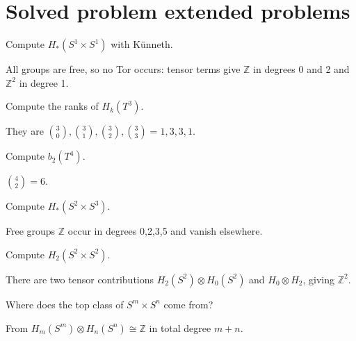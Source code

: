 \section{Solved problem extended problems}

\begin{problem}[Torus]\label{prob:viii27-01}
Compute \(H_*(S^1\times S^1)\) with Künneth.
\end{problem}
\begin{solution}
All groups are free, so no Tor occurs: tensor terms give \(\mathbb Z\) in degrees 0 and 2 and \(\mathbb Z^2\) in degree 1.
\end{solution}

\begin{problem}\label{prob:viii27-02}
Compute the ranks of \(H_k(T^3)\).
\end{problem}
\begin{solution}
They are \(\binom30,\binom31,\binom32,\binom33=1,3,3,1\).
\end{solution}

\begin{problem}\label{prob:viii27-03}
Compute \(b_2(T^4)\).
\end{problem}
\begin{solution}
\(\binom42=6\).
\end{solution}

\begin{problem}\label{prob:viii27-04}
Compute \(H_*(S^2\times S^3)\).
\end{problem}
\begin{solution}
Free groups \(\mathbb Z\) occur in degrees 0,2,3,5 and vanish elsewhere.
\end{solution}

\begin{problem}\label{prob:viii27-05}
Compute \(H_2(S^2\times S^2)\).
\end{problem}
\begin{solution}
There are two tensor contributions \(H_2(S^2)\otimes H_0(S^2)\) and \(H_0\otimes H_2\), giving \(\mathbb Z^2\).
\end{solution}

\begin{problem}\label{prob:viii27-06}
Where does the top class of \(S^m\times S^n\) come from?
\end{problem}
\begin{solution}
From \(H_m(S^m)\otimes H_n(S^n)\cong\mathbb Z\) in total degree \(m+n\).
\end{solution}

